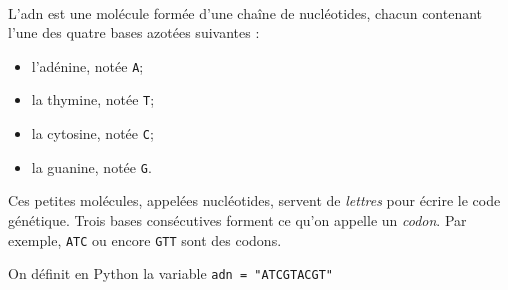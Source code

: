\documentclass[11pt,a4paper]{article}
\begin{document}
\begin{Exercise}[title={Représentation et manipulation de l'{\sc adn}}, origin={\bac \; \sc capes nsi L3}]\\
	L'{\sc adn} est une molécule formée d'une chaîne de nucléotides, chacun contenant l'une des quatre bases azotées suivantes :
	\begin{itemize}
		\item l'adénine, notée {\tt A};
		\item la thymine, notée {\tt T};
		\item la cytosine, notée {\tt C};
		\item la guanine, notée {\tt G}.
	\end{itemize}
	Ces petites molécules, appelées nucléotides, servent de \og{} \textit{lettres} \fg{} pour écrire le code génétique. Trois bases consécutives forment ce qu'on appelle un \textit{codon}. Par exemple, {\tt ATC} ou encore {\tt GTT} sont des codons.
	\medskip

	On définit en Python la variable \texttt{adn = "ATCGTACGT"}


\end{Exercise}
\end{document}
